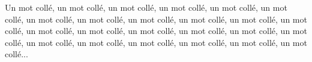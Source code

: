 \documentclass[10pt,a4paper]{article}
\begin{document}
Un mot \hspace{-0.3em}collé, un mot \hspace{-0.3em}collé, un mot \hspace{-0.3em}collé,
un mot \hspace{-0.3em}collé, un mot \hspace{-0.3em}collé, un mot \hspace{-0.3em}collé,
un mot \hspace{-0.3em}collé, un mot \hspace{-0.3em}collé, un mot \hspace{-0.3em}collé,
un mot \hspace{-0.3em}collé, un mot \hspace{-0.3em}collé, un mot \hspace{-0.3em}collé,
un mot \hspace{-0.3em}collé, un mot \hspace{-0.3em}collé, un mot \hspace{-0.3em}collé,
un mot \hspace{-0.3em}collé, un mot \hspace{-0.3em}collé, un mot \hspace{-0.3em}collé,
un mot \hspace{-0.3em}collé, un mot \hspace{-0.3em}collé, un mot \hspace{-0.3em}collé,
un mot \hspace{-0.3em}collé, un mot \hspace{-0.3em}collé, un mot \hspace{-0.3em}collé...
\end{document}
